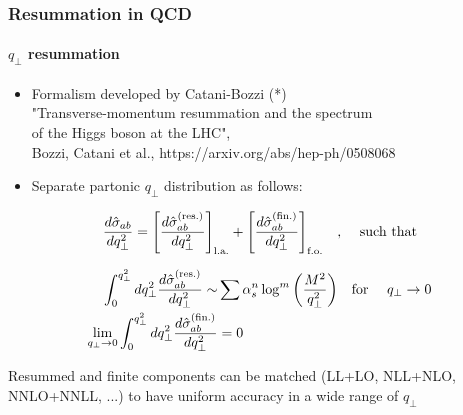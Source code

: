 \documentclass[aspectratio=43]{beamer}
\begin{document}
\begin{frame}

	\frametitle{Resummation in QCD}
	\framesubtitle{$q_{\perp}$ resummation}

	\footnotesize
	
	\begin{itemize}
		\item Formalism developed by Catani-Bozzi (*) \\
		{\color{blue}"Transverse-momentum resummation and the spectrum\\
			of the Higgs boson at the LHC",\\
		Bozzi, Catani et al., https://arxiv.org/abs/hep-ph/0508068}
		\item Separate partonic $q_{\perp}$ distribution as follows:
	\end{itemize}
	
	\begin{equation}
		\frac{d\hat{\sigma}_{ab}}{dq_{\perp}^{2}} =
		\Bigg[ \frac{d\hat{\sigma}^{\textrm{(res.)}}_{ab}}{dq_{\perp}^{2}} \Bigg]_{\textrm{l.a.}} + 
		\Bigg[ \frac{d\hat{\sigma}^{\textrm{(fin.)}}_{ab}}{dq_{\perp}^{2}} \Bigg]_{\textrm{f.o.}} \textrm{\quad, \quad such that} \nonumber
	\end{equation}

	\begin{align}
		\int_{0}^{q_{\perp}^{2}} dq_{\perp}^{2} \frac{d\hat{\sigma}^{\textrm{(res.)}}_{ab}}{dq_{\perp}^{2}} \sim & \sum \alpha_{s}^{n} \log^{m} \bigg( \frac{M^{2}}{q_{\perp}^{2}} \bigg) \textrm{\quad for \quad} q_{\perp} \rightarrow 0 \nonumber \\
		\lim_{q_{\perp} \rightarrow 0}\int_{0}^{q_{\perp}^{2}} dq_{\perp}^{2} \frac{d\hat{\sigma}^{\textrm{(fin.)}}_{ab}}{dq_{\perp}^{2}} &= 0 \nonumber 
	\end{align}

	Resummed and finite components can be matched (LL+LO, NLL+NLO,\\ NNLO+NNLL, ...) to have uniform accuracy in a wide range of $q_{\perp}$
	
\end{frame}
\end{document}

